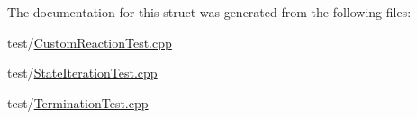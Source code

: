 The documentation for this struct was generated from the following files\+:\begin{DoxyCompactItemize}
\item 
test/\mbox{\hyperlink{_custom_reaction_test_8cpp}{Custom\+Reaction\+Test.\+cpp}}\item 
test/\mbox{\hyperlink{_state_iteration_test_8cpp}{State\+Iteration\+Test.\+cpp}}\item 
test/\mbox{\hyperlink{_termination_test_8cpp}{Termination\+Test.\+cpp}}\end{DoxyCompactItemize}

